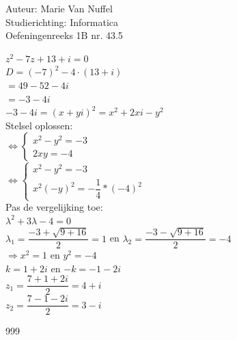 \documentclass[a4paper]{article}
\begin{document}
  
\noindent \large Auteur: Marie Van Nuffel \\
\noindent \large Studierichting: Informatica\\
\noindent \large Oefeningenreeks 1B nr. 43.5\\

\medskip

\normalsize

$z^2-7z+13+i=0$\\

$D =(-7)^2-4\cdot(13+i)$ \\

$=49-52-4i$\\

$=-3-4i$\\

$-3-4i = (x+yi)^2 = x^2+2xi-y^2$\\

Stelsel oplossen:\\

$\Leftrightarrow \left \{
\begin{array}{l}
    x^2 - y^2 = -3 \\
    2xy =-4
\end{array}
\right .$\\

$\Leftrightarrow \left \{
\begin{array}{l}
    x^2 - y^2 = -3 \\
    x^2(-y)^2 = -\dfrac{1}{4}*(-4)^2
\end{array}
\right .$\\


Pas de vergelijking toe:\\

$\lambda^2+3\lambda-4=0$\\


$\lambda_{1}=\dfrac{-3+\sqrt{9+16}}{2}=1$ en $\lambda_{2}=\dfrac{-3-\sqrt{9+16}}{2}=-4$\\


$\Rightarrow x^2=1$ en $y^2=-4$\\

$k=1+2i$ en $-k=-1-2i$\\

$z_{1}=\dfrac{7+1+2i}{2}=4+i$\\

$z_{2}=\dfrac{7-1-2i}{2}=3-i$\\





\begin{thebibliography}{999}
\end{thebibliography}
\end{document}
